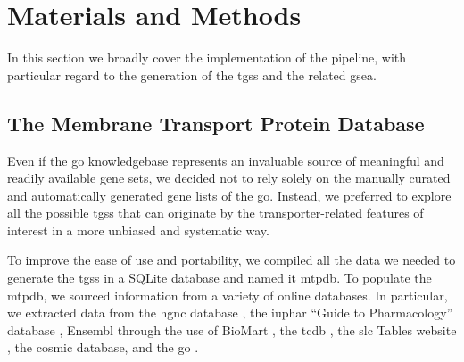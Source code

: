 \section{Materials and Methods}

In this section we broadly cover the implementation of the pipeline, with particular regard to the generation of the \glspl{tgs} and the related \gls{gsea}.

\subsection{The Membrane Transport Protein Database}

Even if the \gls{go} knowledgebase \cite{ashburnerGeneOntologyTool2000,thegeneontologyconsortiumGeneOntologyKnowledgebase2023} represents an invaluable source of meaningful and readily available gene sets, we decided not to rely solely on the manually curated and automatically generated gene lists of the \gls{go}.
Instead, we preferred to explore all the possible \glspl{tgs} that can originate by the transporter-related features of interest in a more unbiased and systematic way.

To improve the ease of use and portability, we compiled all the data we needed to generate the \glspl{tgs} in a SQLite database and named it \gls{mtpdb}.
To populate the \gls{mtpdb}, we sourced information from a variety of online databases.
In particular, we extracted data from %
the \gls{hgnc} database \cite{sealGenenamesOrgHGNC2023},
the \gls{iuphar} ``Guide to Pharmacology'' database \cite{hardingIUPHARBPSGuide2022},
Ensembl \cite{cunninghamEnsembl20222022} through the use of BioMart \cite{smedleyBioMartBiologicalQueries2009},
the \gls{tcdb} \cite{saierTransporterClassificationDatabase2021},
the \gls{slc} Tables website \cite{hedigerABCsMembraneTransporters2013},
the \gls{cosmic} \cite{tateCOSMICCatalogueSomatic2019} database,
and the \gls{go} \cite{ashburnerGeneOntologyTool2000, thegeneontologyconsortiumGeneOntologyKnowledgebase2023}.

